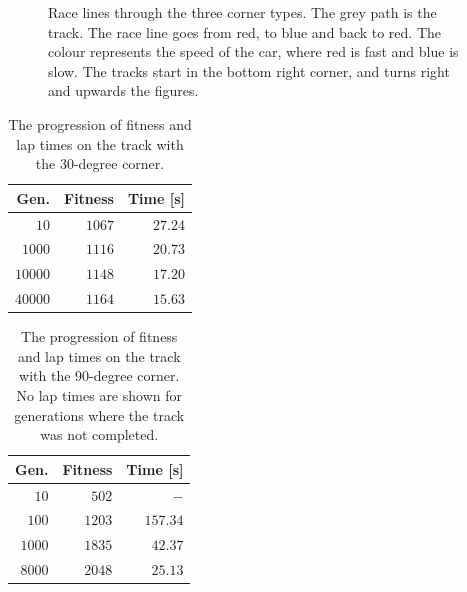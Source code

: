 \begin{figure}[H]
    \centering
    \qquad
    \qquad
    \caption{Race lines through the three corner types. The grey path is the track. The race line goes from red, to blue and back to red. The colour represents the speed of the car, where red is fast and blue is slow. The tracks start in the bottom right corner, and turns right and upwards the figures.}
    \label{fig:short_racelines}
\end{figure}

\begin{table}[H] 
  \centering
  \begin{tabular}{rrr}
    \toprule
    Gen. & Fitness & Time [s]\\
    \midrule
    $10$    & $1067$     & $27.24$  \\
    $1000$   & $1116$    & $20.73$  \\
    $10000$  & $1148$    & $17.20$  \\
    $40000$  & $1164$    & $15.63$  \\
    \bottomrule
  \end{tabular}
  \caption{The progression of fitness and lap times on the track with the 30-degree corner.}
  \label{tab:30deg}
\end{table}

\begin{table}[H] 
  \centering
  \begin{tabular}{rrr}
    \toprule
    Gen. & Fitness & Time [s]\\
    \midrule
    $10$    & $502$     & $-$       \\
    $100$   & $1203$    & $157.34$  \\
    $1000$  & $1835$    & $42.37$   \\
    $8000$  & $2048$    & $25.13$   \\
    \bottomrule
  \end{tabular}
  \caption{The progression of fitness and lap times on the track with the 90-degree corner. No lap times are shown for generations where the track was not completed.}
  \label{tab:90deg}
\end{table}


